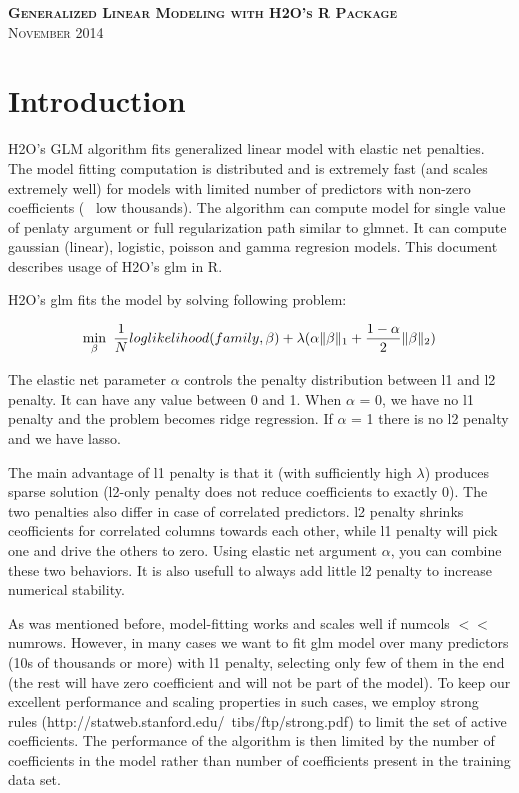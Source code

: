 \documentclass[11pt]{article}
\begin{document}
\thispagestyle{empty} %

\begin{center}
\textsc{\Large\bf{Generalized Linear Modeling  with H2O's R Package}}
\\
\bigskip
\textsc{November 2014}
\end{center}
\bigskip
\bigskip
\bigskip
\bigskip
\tableofcontents

\newpage


\section{Introduction} \label{1}

H2O's GLM algorithm fits generalized linear model with elastic net penalties. The model fitting computation is distributed and is extremely fast (and scales extremely well) for models with limited number of predictors with non-zero coefficients (~ low thousands). The algorithm can compute model for single value of penlaty argument or full regularization path similar to glmnet. It can compute gaussian (linear), logistic, poisson and gamma regresion models. This document describes usage of H2O's glm in R.

H2O's glm fits the model by solving following problem:

\[ \min\limits_{\beta}\ {{1\over{N}} loglikelihood(family,\beta)  + \lambda (\alpha \| \beta \|_1}  + {1- \alpha \over 2} \| \beta \|_2) \]

The elastic net parameter $\alpha$ controls the penalty distribution between l1 and l2 penalty. It can have any value between 0 and 1. When $\alpha$ = 0, we have no l1 penalty and the problem becomes ridge regression. If $\alpha$ = 1 there is no l2 penalty and we have lasso.

The main advantage of l1 penalty is that it (with sufficiently high $\lambda$) produces sparse solution (l2-only penalty does not reduce coefficients to exactly 0). The two penalties also differ in case of correlated predictors. l2 penalty shrinks ceofficients for correlated columns towards each other, while l1 penalty will pick one and drive the others to zero. Using elastic net argument $\alpha$, you can combine these two behaviors. It is also usefull to always add little l2 penalty to increase numerical stability.

As was mentioned before, model-fitting works and scales well if numcols $<<$ numrows. However, in many cases we want to fit glm model over many predictors (10s of thousands or more) with l1 penalty, selecting only few of them in the end (the rest will have zero coefficient and will not be part of the model). To keep our excellent performance and scaling properties in such cases, we employ strong rules (http://statweb.stanford.edu/~tibs/ftp/strong.pdf) to limit the set of active coefficients. The performance of the algorithm is then limited by the number of coefficients in the model rather than number of coefficients present in the training data set. 
\end{document}
